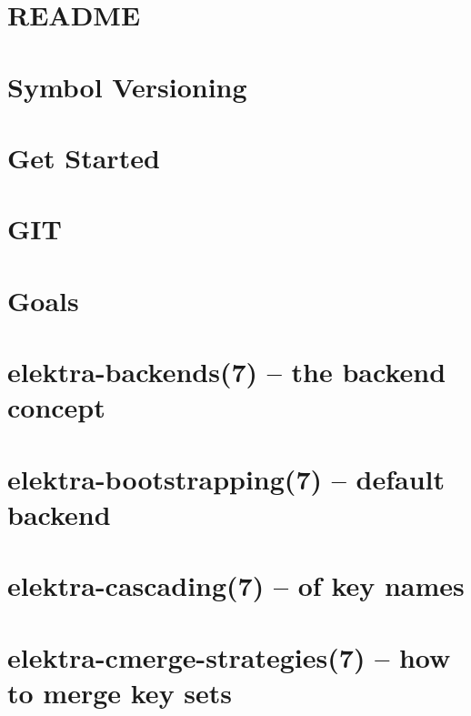 \let\mypdfximage\pdfximage\def\pdfximage{\immediate\mypdfximage}\documentclass[twoside]{book}
\newcommand{\+}{\discretionary{\mbox{\scriptsize$\hookleftarrow$}}{}{}}
\begin{document}
\chapter{README}
\label{md_doc_dev_README}

\chapter{Symbol Versioning}
\label{doc_dev_symbol-versioning_md}

\chapter{Get Started}
\label{doc_GETSTARTED_md}

\chapter{GIT}
\label{doc_GIT_md}

\chapter{Goals}
\label{doc_GOALS_md}

\chapter{elektra-\/backends(7) -- the backend concept}
\label{doc_help_elektra-backends_md}

\chapter{elektra-\/bootstrapping(7) -- default backend}
\label{doc_help_elektra-bootstrapping_md}

\chapter{elektra-\/cascading(7) -- of key names}
\label{doc_help_elektra-cascading_md}

\chapter{elektra-\/cmerge-\/strategies(7) -- how to merge key sets}
\label{doc_help_elektra-cmerge-strategy_md}

\end{document}
